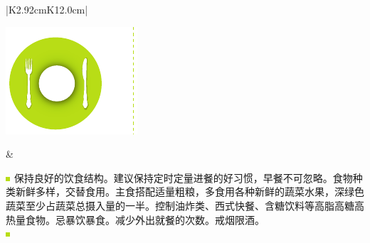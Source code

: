\noindent
\fontsize{8pt}{11pt}\selectfont
{}
\setlength{\arrayrulewidth}{.5pt}
\begin{center}
\begin{tabular}{|K{2.92cm}K{12.0cm}|}
\hline
\parbox[c][5.0cm]{.95\hsize}{
\noindent
\includegraphics[scale=1.0]{baohulifoodwithvline.pdf}
}
 &
\hspace*{4mm}
\parbox{.95\hsize}{
\vspace*{3mm}
\begin{spacing}{1.5}
\includegraphics[scale=1.0]{xiaofangkuai.pdf}
{\fontsize{8pt}{11pt}\selectfont 保持良好的饮食结构。建议保持定时定量进餐的好习惯，早餐不可忽略。食物种类新鲜多样，交替食用。主食搭配适量粗粮，多食用各种新鲜的蔬菜水果，深绿色蔬菜至少占蔬菜总摄入量的一半。控制油炸类、西式快餐、含糖饮料等高脂高糖高热量食物。忌暴饮暴食。减少外出就餐的次数。戒烟限酒。}
\\
\includegraphics[scale=1.0]{xiaofangkuai.pdf}
{\fontsize{8pt}{11pt}\selectfont {建议适量多吃糙米、南瓜、橘子、四季豆、燕麦，这些食物能帮助栖粪杆菌属、阿克曼氏菌属、双歧杆菌属的增殖，有利于提高肠道保护力。}}
\end{spacing}
} \\
\hline


\end{tabular}
\end{center}
